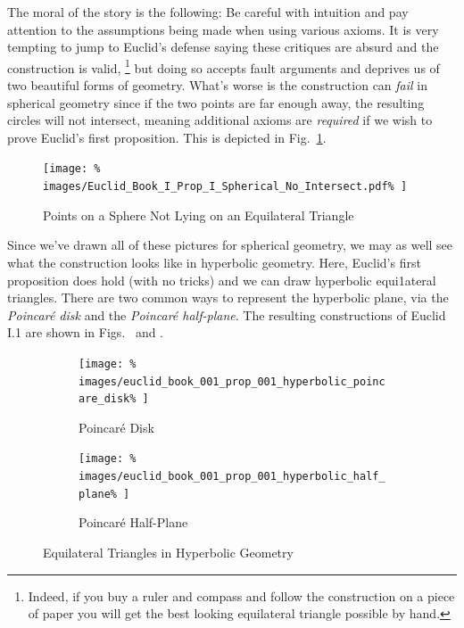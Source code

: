        The moral of the story is the following: Be careful with intuition and
        pay attention to the assumptions being made when using various axioms.
        It is very tempting to jump to Euclid's defense saying these critiques
        are absurd and the construction is valid,%
        \footnote{%
            Indeed, if you buy a ruler and compass and follow the construction
            on a piece of paper you will get the best looking equilateral
            triangle possible by hand.
        }
        but doing so accepts fault arguments and deprives us of two beautiful
        forms of geometry. What's worse is the construction can \textit{fail} in
        spherical geometry since if the two points are far enough away, the
        resulting circles will not intersect, meaning additional axioms are
        \textit{required} if we wish to prove Euclid's first proposition. This
        is depicted in Fig.~\ref{fig:Spherical_Euclid_I_1_No_Intersect}.
        \begin{figure}
            \centering
            \captionsetup{type=figure}
            \texttt{[image: \%
                images/Euclid\_Book\_I\_Prop\_I\_Spherical\_No\_Intersect.pdf\%
            ]}
            \caption{Points on a Sphere Not Lying on an Equilateral Triangle}
            \label{fig:Spherical_Euclid_I_1_No_Intersect}
        \end{figure}
        \par\hfill\par
        Since we've drawn all of these pictures for spherical geometry, we may
        as well see what the construction looks like in hyperbolic geometry.
        Here, Euclid's first proposition does hold (with no tricks) and we can
        draw hyperbolic equi1ateral triangles. There are two common ways to
        represent the hyperbolic plane, via the
        \textit{Poincar\'{e} disk} and the \textit{Poincar\'{e} half-plane}. The
        resulting constructions of Euclid I.1 are shown in
        Figs.~ and
        .
        \begin{figure}[H]
            \centering
            \begin{subfigure}[b]{0.49\textwidth}
                \centering
                \captionsetup{type=figure}
                \texttt{[image: \%
                    images/euclid\_book\_001\_prop\_001\_hyperbolic\_poincare\_disk\%
                ]}
                \caption{Poincar\'{e} Disk}
                \label{fig:Euclid_Book_I_Prop_I_Poincare_Disk}
            \end{subfigure}
            \begin{subfigure}[b]{0.49\textwidth}
                \centering
                \captionsetup{type=figure}
                \texttt{[image: \%
                    images/euclid\_book\_001\_prop\_001\_hyperbolic\_half\_plane\%
                ]}
                \caption{Poincar\'{e} Half-Plane}
                \label{fig:Euclid_Book_I_Prop_I_Poincare_Half_Plane}
            \end{subfigure}
            \caption{Equilateral Triangles in Hyperbolic Geometry}
        \end{figure}
